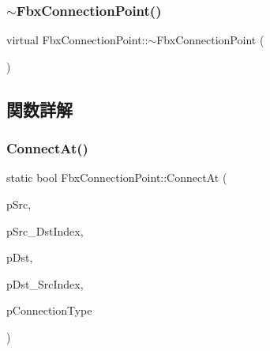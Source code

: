 \mbox{\label{class_fbx_connection_point_a806c8989f3700242c2aa7b9ec74e7396}} 
\subsubsection{\texorpdfstring{$\sim$\+Fbx\+Connection\+Point()}{~FbxConnectionPoint()}}
{\footnotesize\ttfamily virtual Fbx\+Connection\+Point\+::$\sim$\+Fbx\+Connection\+Point (\begin{DoxyParamCaption}{ }\end{DoxyParamCaption})\hspace{0.3cm}{\ttfamily [virtual]}}



\subsection{関数詳解}
\mbox{\label{class_fbx_connection_point_ac02d782e45f10a7b0961d24097e5dcbd}} 
\subsubsection{\texorpdfstring{Connect\+At()}{ConnectAt()}}
{\footnotesize\ttfamily static bool Fbx\+Connection\+Point\+::\+Connect\+At (\begin{DoxyParamCaption}\item[{\hyperlink{class_fbx_connection_point}{Fbx\+Connection\+Point} $\ast$}]{p\+Src,  }\item[{int}]{p\+Src\+\_\+\+Dst\+Index,  }\item[{\hyperlink{class_fbx_connection_point}{Fbx\+Connection\+Point} $\ast$}]{p\+Dst,  }\item[{int}]{p\+Dst\+\_\+\+Src\+Index,  }\item[{\hyperlink{class_fbx_connection_a3df448a5db356652ab99fd2be2553749}{Fbx\+Connection\+::\+E\+Type}}]{p\+Connection\+Type }\end{DoxyParamCaption})\hspace{0.3cm}{\ttfamily [static]}}

